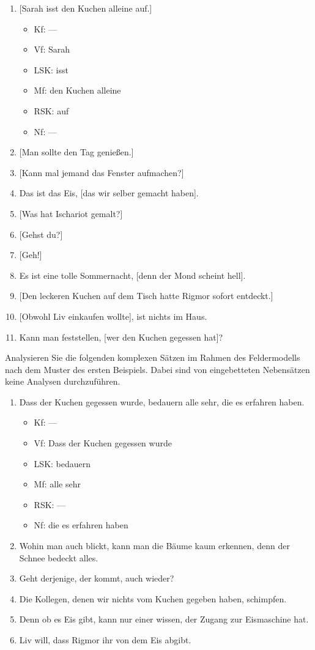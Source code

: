 \begin{enumerate}
  \item{[Sarah isst den Kuchen alleine auf.]}
    \begin{itemize}
      \item Kf: ---
      \item Vf: Sarah
      \item LSK: isst
      \item Mf: den Kuchen alleine
      \item RSK: auf
      \item Nf: ---
    \end{itemize}
  \item{[Man sollte den Tag genießen.]}
  \item{[Kann mal jemand das Fenster aufmachen?]}
  \item\label{it:adverbialsaetze182} Das ist das Eis, [das wir selber gemacht haben].
  \item{[Was hat Ischariot gemalt?]}
  \item{[Gehst du?]}
  \item{\label{it:adverbialsaetze183} [Geh!]}
  \item\label{it:adverbialsaetze184} Es ist eine tolle Sommernacht, [denn der Mond scheint hell].
  \item{[Den leckeren Kuchen auf dem Tisch hatte Rigmor sofort entdeckt.]}
  \item{[Obwohl Liv einkaufen wollte], ist nichts im Haus.}
  \item Kann man feststellen, [wer den Kuchen gegessen hat]?
\end{enumerate}

 \label{exc:saetze02} Analysieren Sie die folgenden komplexen Sätzen im Rahmen des Feldermodells nach dem Muster des ersten Beispiels.
Dabei sind von eingebetteten Nebensätzen keine Analysen durchzuführen.

\begin{enumerate}
  \item Dass der Kuchen gegessen wurde, bedauern alle sehr, die es erfahren haben.
    \begin{itemize}
      \item Kf: ---
      \item Vf: Dass der Kuchen gegessen wurde
      \item LSK: bedauern
      \item Mf: alle sehr
      \item RSK: ---
      \item Nf: die es erfahren haben
    \end{itemize}
  \item Wohin man auch blickt, kann man die Bäume kaum erkennen, denn der Schnee bedeckt alles.
  \item Geht derjenige, der kommt, auch wieder?
  \item Die Kollegen, denen wir nichts vom Kuchen gegeben haben, schimpfen.
  \item Denn ob es Eis gibt, kann nur einer wissen, der Zugang zur Eismaschine hat.
  \item Liv will, dass Rigmor ihr von dem Eis abgibt.
\end{enumerate}

